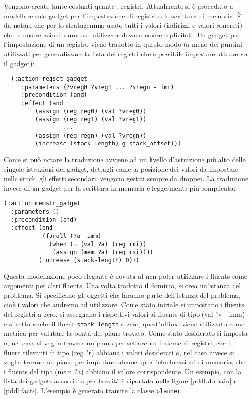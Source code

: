 Vengono create tante costanti quante i registri.  Attualmente si è
proceduto a modellare solo gadget per l'impostazione di registri o la
scrittura di memoria. È da notare che per lo stratagemma usato tutti i
valori (indirizzi e valori concreti) che le nostre azioni vanno ad
utilizzare devono essere esplicitati. Un gadget per l'impostazione di
un registro viene tradotto in questo modo (a meno dei puntini
utilizzati per generalizzare la lista dei registri che è possibile
impostare attraverso il gadget):

\begin{lstlisting}
  (:action regset_gadget
	 :parameters (?vreg0 ?vreg1 ... ?vregn - imm)
	 :precondition (and)
	 :effect (and
	 	 (assign (reg reg0) (val ?vreg0))
	 	 (assign (reg reg1) (val ?vreg1))
                 ...
	 	 (assign (reg regn) (val ?vregn))
		 (increase (stack-length) g.stack_offset)))
\end{lstlisting}

Come si può notare la traduzione avviene ad un livello d'astrazione
più alto delle singole istruzioni del gadget, dettagli come la
posizione dei valori da impostare nello stack, gli effetti secondari,
vengono gestiti sempre da dropper. La traduzione invece di un gadget
per la scrittura in memoria è leggermente più complicata:

\begin{lstlisting}
(:action memstr_gadget
  :parameters ()
  :precondition (and)
  :effect (and 
           (forall (?a -imm) 
             (when (= (val ?a) (reg rdi))
              (assign (mem ?a) (reg rsi))))
          (increase (stack-length) 0)))
\end{lstlisting}

Questa modellazione poco elegante è dovuta al non poter utilizzare i
fluents come argomenti per altri fluents.  Una volta tradotto il
dominio, si crea un'istanza del problema. Si specificano gli oggetti
che faranno parte dell'istanza del problema, cioè i valori che andremo
ad utilizzare. Come stato iniziale si impostano i fluents dei registri
a zero, si assegnano i rispettivi valori ai fluents di tipo (val ?v -
imm) e si setta anche il fluent \lstinline{stack-length} a zero,
quest'ultimo viene utilizzato come metrica per valutare la bontà del
piano trovato. Come stato desiderato si imposta o, nel caso si voglia
trovare un piano per settare un insieme di registri, che i fluent
rilevanti di tipo (reg ?r) abbiano i valori desiderati o, nel caso
invece si voglia trovare un piano per impostare alcune specifiche
locazioni di memoria, che i fluents del tipo (mem ?a) abbiano il
valore corrispondente. Un esempio, con la lista dei gadgets accorciata
per brevità è riportato nelle figure \ref{pddl:domain} e
\ref{pddl:facts}. L'esempio è generato tramite la classe
\lstinline{planner}.



